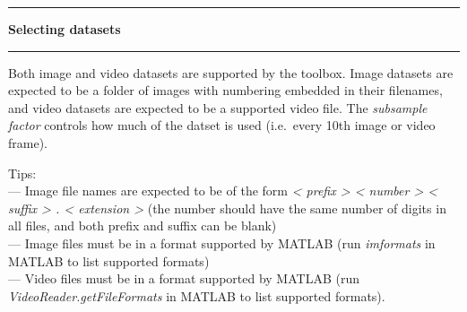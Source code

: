 \noindent\rule{\textwidth}{1pt}
\indent \textbf{Selecting datasets}
\noindent\rule{\textwidth}{1pt}
\smallskip
\parbox{\textwidth}{Both image and video datasets are supported by the toolbox. Image datasets are expected to be a folder of images with numbering embedded in their filenames, and video datasets are expected to be a supported video file. The \textit{subsample factor} controls how much of the datset is used (i.e.\ every 10th image or video frame).}
\bigskip
\parbox{\textwidth}{Tips: \\ --- Image file names are expected to be of the form \textit{\textless{} prefix \textgreater{} \textless{} number \textgreater{} \textless{} suffix \textgreater{} . \textless{} extension \textgreater{}} (the number should have the same number of digits in all files, and both prefix and suffix can be blank) \\ --- Image files must be in a format supported by MATLAB (run \textit{imformats} in MATLAB to list supported formats) \\ --- Video files must be in a format supported by MATLAB (run \textit{VideoReader.getFileFormats} in MATLAB to list supported formats).}
